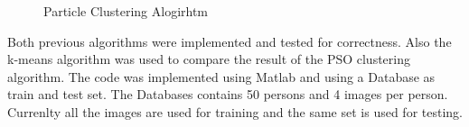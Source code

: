 \documentclass[a4paper,twoside]{article}
\begin{document}
\begin{figure}
 \begin{center}
 \centering
\caption{ Particle Clustering Alogirhtm}
\label{fig:PSOswarm}
 \end{center}\end{figure}
Both previous algorithms  were implemented and tested for correctness. Also the k-means algorithm was used to compare the result of the PSO clustering algorithm. The code was implemented using Matlab and using a Database as train and test set. The Databases contains 50 persons and 4 images per person. Currenlty all the images are used for training and the same set is used for testing.
\end{document}
